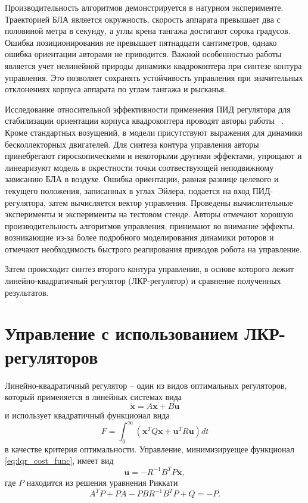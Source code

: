 Производительность алгоритмов демонстрируется в натурном эксперименте. Траекторией БЛА является окружность, скорость аппарата превышает два с половиной метра в секунду, а углы крена тангажа достигают сорока градусов. Ошибка позиционирования не превышает пятнадцати сантиметров, однако ошибка ориентации авторами не приводится. Важной особенностью работы является учет нелинейной природы динамики квадрокоптера при синтезе контура управления. Это позволяет сохранять устойчивость управления при значительных отклонениях корпуса аппарата по углам тангажа и рысканья.

Исследование относительной эффективности применения ПИД регулятора для стабилизации ориентации корпуса квадрокоптера проводят авторы работы ~\cite{Bouabdallah01}. Кроме стандартных возущений, в модели присутствуют выражения для динамики бесколлекторных двигателей. Для синтеза контура управления авторы принебрегают гироскопическими и некоторыми другими эффектами, упрощают и линеаризуют модель в окрестности точки соотвествующей неподвижному зависанию БЛА в воздухе. Ошибка ориентации, равная разнице целевого и текущего положения, записанных в углах Эйлера, подается на вход ПИД-регулятора, затем вычисляется вектор управления. Проведены вычислительные эксперименты и эксперименты на тестовом стенде. Авторы отмечают хорошую производительность алгоритмов управления, принимают во внимание эффекты, возникающие из-за более подробного моделирования динамики роторов и отмечают необходимость быстрого реагирования приводов робота на управление.

Затем происходит синтез второго контура управления, в основе которого лежит линейно-квадратичный регулятор (ЛКР-регулятор) и сравнение полученных результатов.
	

\section{Управление с использованием ЛКР-регуляторов}

Линейно-квадратичный регулятор -- один из видов оптимальных регуляторов, который применяется в линейных системах вида
\begin{equation} \label{eq:linear_dyn_system}
\dot{\bm{x}} = A\bm{x} + B\bm{u}
\end{equation}
и  использует квадратичный функционал вида
	\begin{equation} \label{eq:lqr_cost_func}
	F = \int_0^{\infty}{(\bm{x}^T Q \bm{x} + \bm{u}^T R \bm{u})} dt
	\end{equation}
в качестве критерия оптимальности. Управление, минимизируещее функционал \eqref{eq:lqr_cost_func}, имеет вид
	\begin{equation} \label{eq:lqr_control_law}
	\bm{u} = -R^{-1} B^T P \bm{x},
	\end{equation}
	где $P$ находится из решения уравнения Риккати
	\begin{equation} \label{eq:riqatty}
	A^T P + P A - P B R^{-1} B^T P + Q = -\dot{P}.
	\end{equation}


